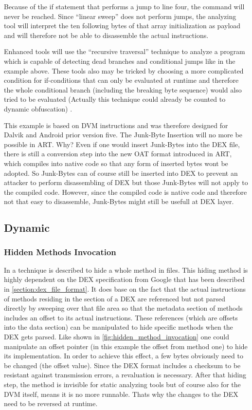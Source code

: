 Because of the if statement that performs a jump to line four, the  command will never be reached.
Since ``linear sweep'' does not perform jumps, the analyzing tool
will interpret the ten following bytes of that array initialization as payload and will therefore not be able to disassemble the actual instructions.

Enhanced tools will use the ``recursive traversal'' technique to analyze a
program which is capable of detecting dead branches and conditional jumps like in the example above.
These tools also may be tricked by choosing a more complicated condition for
if-conditions that can only be evaluated at runtime and therefore the
whole conditional branch (including the breaking byte sequence) would also tried to be evaluated (Actually this technique could already be counted to dynamic obfuscation) \parencite[p.68]{lvl_imp}.


This example is based on DVM instructions and was therefore designed for Dalvik and
Android prior version five.
The Junk-Byte Insertion will no more be possible in ART. Why?
Even if one would insert Junk-Bytes into the DEX file, there is still a conversion
step into the new OAT format introduced in ART, which compiles into native code so
that any form of inserted bytes wont be adopted. So Junk-Bytes can of course still
be inserted into DEX to prevent an attacker to perform disassembling of DEX but those
Junk-Bytes will not apply to the compiled code. However, since the compiled code
is native code and therefore not that easy to disassemble, Junk-Bytes might still be
usefull at DEX layer.

\subsection{Dynamic}
\subsubsection{Hidden Methods Invocation}
In \parencite[p.82f]{lvl_imp} a technique is described to hide a whole method
in  files. This hiding method is highly dependent on the DEX specification from Google \parencite{dex} that has been described in
\autoref{section:dex_file_format}.
It does base on the fact that the actual instructions of methods residing
in the  section of a DEX are referenced but not parsed directly
by sweeping over that file area so that the metadata section of methods
includes an offset to its actual instructions.
These references (which are offsets into the data section) can be manipulated
to hide specific methods when the DEX gets parsed. Like shown in
 \autoref{fig:hidden_method_invocation} one could manipulate
 an offset pointer (in this example the offset from method one)
to hide its implementation.
In order to achieve this effect, a few bytes obviously need to be changed
(the offset value).
Since the DEX format includes a checksum to be resistant
against transmission errors, a revaluation is necessary.
After that hiding step, the method is invisible for static analyzing tools
but of course also for the DVM itself, means it is no more runnable.
Thats why the changes to the DEX need to be reversed at runtime.

